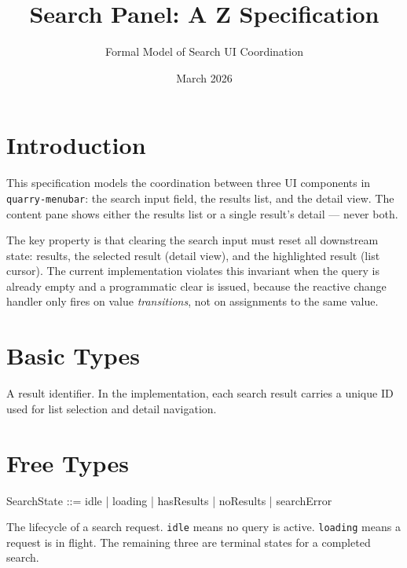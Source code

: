 \documentclass[a4paper,10pt,fleqn]{article}
\begin{document}
\title{Search Panel: A Z Specification}
\author{Formal Model of Search UI Coordination}
\date{March 2026}
\maketitle

\tableofcontents
\newpage

\section{Introduction}

This specification models the coordination between three UI components in
\texttt{quarry-menubar}: the search input field, the results list, and the
detail view. The content pane shows either the results list or a single
result's detail --- never both.

The key property is that clearing the search input must reset all
downstream state: results, the selected result (detail view), and the
highlighted result (list cursor). The current implementation violates this
invariant when the query is already empty and a programmatic clear is
issued, because the reactive change handler only fires on value
\emph{transitions}, not on assignments to the same value.

\section{Basic Types}

\begin{zed}
  [RESULTID]
\end{zed}

A result identifier. In the implementation, each search result carries a
unique ID used for list selection and detail navigation.

\section{Free Types}

\begin{zed}
  SearchState ::= idle | loading | hasResults | noResults | searchError
\end{zed}

The lifecycle of a search request. \texttt{idle} means no query is active.
\texttt{loading} means a request is in flight. The remaining three are
terminal states for a completed search.
\end{document}
